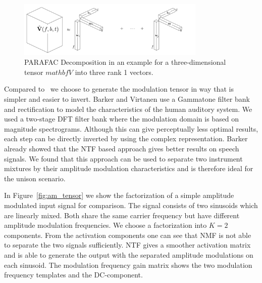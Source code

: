 {{\begin{figure}
  \centering
  \includegraphics[width=0.8\textwidth]{Chapters/06_Separation_Unknown/figures/cpd.pdf}
  \caption{PARAFAC Decomposition in an example for a three-dimensional tensor \(mathbf{V}\) into three rank 1 vectors.}
  \label{fig:cpd}
\end{figure}
\par
Compared to~\cite{barker13} we choose to generate the modulation tensor in way that is simpler and easier to invert. Barker and Virtanen use a Gammatone filter bank and  rectification to model the characteristics of the human auditory system. We used a two-stage DFT filter bank where the modulation domain is based on  magnitude spectrograms. Although this can give perceptually less optimal results, each step can be directly inverted by using the complex representation. Barker already showed that the NTF based approach gives better results on speech signals. We found that this approach can be used to separate two instrument mixtures by their amplitude modulation characteristics and is therefore ideal for the unison scenario.

In Figure~\ref{fig:am_tensor} we show the factorization of a simple amplitude modulated input signal for comparison. The signal consists of two sinusoids which are linearly mixed. Both share the same carrier frequency but have different amplitude modulation frequencies. We choose a factorization into $K=2$ components. From the activation components one can see that NMF is not able to separate the two signals sufficiently. NTF gives a smoother activation matrix and is able to generate the output with the separated amplitude modulations on each sinusoid. The modulation frequency gain matrix shows the two modulation frequency templates and the DC-component.

}}
